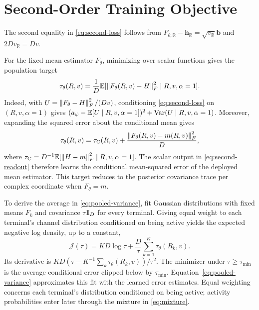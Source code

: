\section{Second-Order Training Objective}
\label{app:second-order-training}

The second equality in \eqref{eq:second-loss} follows from
$F_{\theta,\mathbb R}-\mathbf h_{\mathbb R}
=\sqrt{v_{\mathbb R}}\mathbf b$ and $2Dv_{\mathbb R}=Dv$.

For the fixed mean estimator $F_\theta$, minimizing over scalar
functions gives the population target
\begin{equation}
 \tau_\theta(R,v)=\frac1D
 \mathbb{E}[\left\lVert F_\theta(R,v)-H\right\rVert_F^2\mid R,v,\alpha=1].
 \label{eq:conditional-risk}
\end{equation}
Indeed, with $U=\left\lVert F_\theta-H\right\rVert_F^2/(Dv)$, conditioning
\eqref{eq:second-loss} on $(R,v,\alpha=1)$ gives
$(a_\psi-\mathbb{E}[U\mid R,v,\alpha=1])^2+
\operatorname{Var}(U\mid R,v,\alpha=1)$.
Moreover, expanding the squared error about the conditional mean gives
\begin{equation}
 \tau_\theta(R,v)=\tau_{\rm C}(R,v)
 +\frac{\left\lVert F_\theta(R,v)-m(R,v)\right\rVert_F^2}{D},
 \label{eq:risk-decomposition}
\end{equation}
where $\tau_{\rm C}=D^{-1}
\mathbb{E}[\left\lVert H-m\right\rVert_F^2\mid R,v,\alpha=1]$.
The scalar output in \eqref{eq:second-readout} therefore learns the
conditional mean-squared error of the deployed mean estimator. This
target reduces to the posterior covariance trace per complex coordinate
when $F_\theta=m$.

To derive the average in \eqref{eq:pooled-variance}, fit Gaussian
distributions with fixed means $F_k$ and covariance $\tau\mathbf{I}_D$ for
every terminal. Giving equal weight to each terminal's channel
distribution conditioned on being active yields
the expected negative log density, up to a constant,
\begin{equation}
 \mathcal J(\tau)=KD\log\tau+
 \frac{D}{\tau}\sum_{k=1}^{K}\tau_\theta(R_k,v).
 \label{eq:shared-error-objective}
\end{equation}
Its derivative is
$KD(\tau-K^{-1}\sum_k\tau_\theta(R_k,v))/\tau^2$.
The minimizer under $\tau\geq\tau_{\min}$ is the average conditional
error clipped below by $\tau_{\min}$.
Equation~\eqref{eq:pooled-variance} approximates this fit with the learned
error estimates. Equal weighting concerns each terminal's distribution
conditioned on being active; activity probabilities enter later through
the mixture in \eqref{eq:mixture}.
